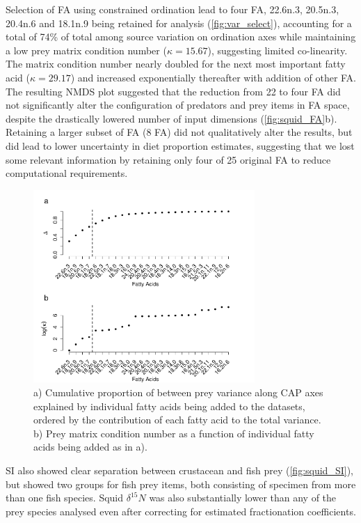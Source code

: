 \documentclass{article}%
\begin{document}
\begin{spacing}{1.9}
\begin{flushleft}
Selection of FA using constrained ordination
lead to four FA, 22.6n.3, 20.5n.3, 20.4n.6 and 18.1n.9 being
retained for analysis (\autoref{fig:var_select}), accounting for a
total of 74\% of total among source variation on ordination axes
while maintaining a low prey matrix condition number ($\kappa=15.67$),
suggesting limited co-linearity. The matrix condition number nearly
doubled for the next most important fatty acid ($\kappa=29.17$) and
increased exponentially thereafter with addition of other FA. The
resulting NMDS plot suggested that the reduction from 22 to four FA did
not significantly alter the configuration of predators and prey items
in FA space, despite the drastically lowered number of input
dimensions (\autoref{fig:squid_FA}b). Retaining a larger subset of
FA (8 FA) did not qualitatively alter the results, but did lead to lower
uncertainty in diet proportion estimates, suggesting that we lost some
relevant information by retaining only four of 25 original FA to
reduce computational requirements.

\begin{figure}
  \begin{center}  
      \includegraphics[width=0.75\textwidth]{figures/var_select.pdf}
      \caption{a) Cumulative proportion of between prey variance along CAP axes
      explained by individual fatty acids being added to the datasets,
      ordered by the contribution of each fatty acid to the total
      variance. b) Prey matrix condition number as a function of
      individual fatty acids being added as in a).}
    \label{fig:var_select}
  \end{center}
\end{figure}

SI also showed clear separation between crustacean and fish prey (\autoref{fig:squid_SI}),
but showed two groups for fish prey items, both consisting of specimen
from more than one fish species. Squid $\delta^{15}N$ was also substantially lower than any
of the prey species analysed even after correcting for estimated
fractionation coefficients.


\end{flushleft}
\end{spacing}
\end{document}
